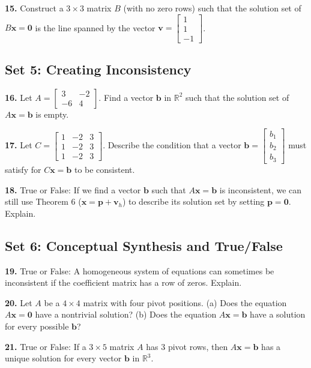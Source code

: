 \documentclass[12pt]{article}
\begin{document}
\textbf{15.} Construct a $3 \times 3$ matrix $B$ (with no zero rows) such that the solution set of $B\mathbf{x} = \mathbf{0}$ is the line spanned by the vector $\mathbf{v} = \begin{bmatrix} 1 \\ 1 \\ -1 \end{bmatrix}$.

\subsection*{Set 5: Creating Inconsistency}
\textbf{16.} Let $A = \begin{bmatrix} 3 & -2 \\ -6 & 4 \end{bmatrix}$. Find a vector $\mathbf{b}$ in $\mathbb{R}^2$ such that the solution set of $A\mathbf{x} = \mathbf{b}$ is empty.

\textbf{17.} Let $C = \begin{bmatrix} 1 & -2 & 3 \\ 1 & -2 & 3 \\ 1 & -2 & 3 \end{bmatrix}$. Describe the condition that a vector $\mathbf{b} = \begin{bmatrix} b_1 \\ b_2 \\ b_3 \end{bmatrix}$ must satisfy for $C\mathbf{x} = \mathbf{b}$ to be consistent.

\textbf{18.} True or False: If we find a vector $\mathbf{b}$ such that $A\mathbf{x} = \mathbf{b}$ is inconsistent, we can still use Theorem 6 ($\mathbf{x} = \mathbf{p} + \mathbf{v}_h$) to describe its solution set by setting $\mathbf{p} = \mathbf{0}$. Explain.

\subsection*{Set 6: Conceptual Synthesis and True/False}
\textbf{19.} True or False: A homogeneous system of equations can sometimes be inconsistent if the coefficient matrix has a row of zeros. Explain.

\textbf{20.} Let $A$ be a $4 \times 4$ matrix with four pivot positions. 
(a) Does the equation $A\mathbf{x} = \mathbf{0}$ have a nontrivial solution? 
(b) Does the equation $A\mathbf{x} = \mathbf{b}$ have a solution for every possible $\mathbf{b}$?

\textbf{21.} True or False: If a $3 \times 5$ matrix $A$ has 3 pivot rows, then $A\mathbf{x} = \mathbf{b}$ has a unique solution for every vector $\mathbf{b}$ in $\mathbb{R}^3$.
\end{document}
